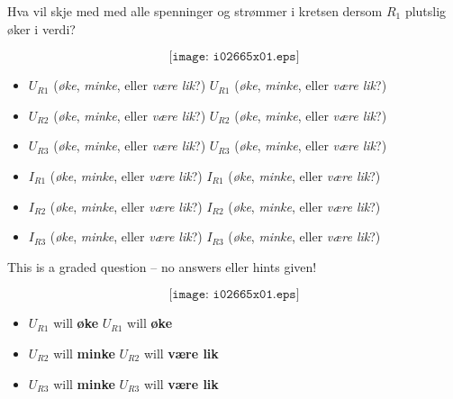 

Hva vil skje med med alle spenninger og strømmer i kretsen dersom $R_1$ plutslig øker i verdi?

$$\texttt{[image: i02665x01.eps]}$$

\begin{itemize}
\item{} $U_{R1}$ ({\it øke}, {\it minke}, eller {\it være lik}?) \hskip 50pt $U_{R1}$ ({\it øke}, {\it minke}, eller {\it være lik}?)
\item{} $U_{R2}$ ({\it øke}, {\it minke}, eller {\it være lik}?) \hskip 50pt $U_{R2}$ ({\it øke}, {\it minke}, eller {\it være lik}?)
\item{} $U_{R3}$ ({\it øke}, {\it minke}, eller {\it være lik}?) \hskip 50pt $U_{R3}$ ({\it øke}, {\it minke}, eller {\it være lik}?)
\end{itemize}

\begin{itemize}
\item{} $I_{R1}$ ({\it øke}, {\it minke}, eller {\it være lik}?) \hskip 50pt $I_{R1}$ ({\it øke}, {\it minke}, eller {\it være lik}?)
\item{} $I_{R2}$ ({\it øke}, {\it minke}, eller {\it være lik}?) \hskip 50pt $I_{R2}$ ({\it øke}, {\it minke}, eller {\it være lik}?)
\item{} $I_{R3}$ ({\it øke}, {\it minke}, eller {\it være lik}?) \hskip 50pt $I_{R3}$ ({\it øke}, {\it minke}, eller {\it være lik}?)
\end{itemize}

\vfil 

\eject






This is a graded question -- no answers eller hints given!







$$\texttt{[image: i02665x01.eps]}$$

\begin{itemize}
\item{} $U_{R1}$ will {\bf øke} \hskip 202pt $U_{R1}$ will {\bf øke}
\item{} $U_{R2}$ will {\bf minke} \hskip 200pt $U_{R2}$ will {\bf være lik}
\item{} $U_{R3}$ will {\bf minke} \hskip 200pt $U_{R3}$ will {\bf være lik}
\end{itemize}

